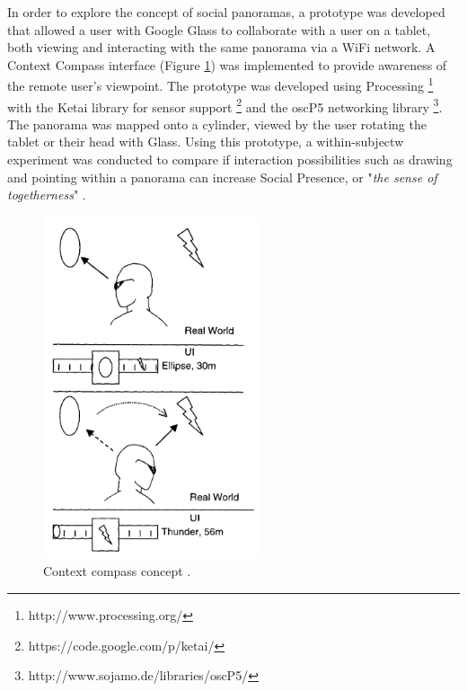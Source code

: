 In order to explore the concept of social panoramas, a prototype was developed that allowed a user with Google Glass to collaborate with a user on a tablet, both viewing and interacting with the same panorama via a WiFi network. A Context Compass interface \cite{Suomela2000} (Figure \ref{fig:ismar14:context-compass}) was implemented to provide awareness of the remote user's viewpoint. The prototype was developed using Processing \footnote{http://www.processing.org/} with the Ketai library for sensor support \footnote{https://code.google.com/p/ketai/} and the oscP5 networking library \footnote{http://www.sojamo.de/libraries/oscP5/}. The panorama was mapped onto a cylinder, viewed by the user rotating the tablet or their head with Glass. Using this prototype, a within-subjectw experiment was conducted to compare if interaction possibilities such as drawing and pointing within a panorama can increase Social Presence, or "\textit{the sense of togetherness}" \cite{Basdogan2001}. 

\begin{figure}[ht]
	\centering
	\includegraphics[width=2.5in]{images/ismar14/context-compass.PNG}
	\caption{Context compass concept \cite{Suomela2000}.}
	\label{fig:ismar14:context-compass}
\end{figure}


